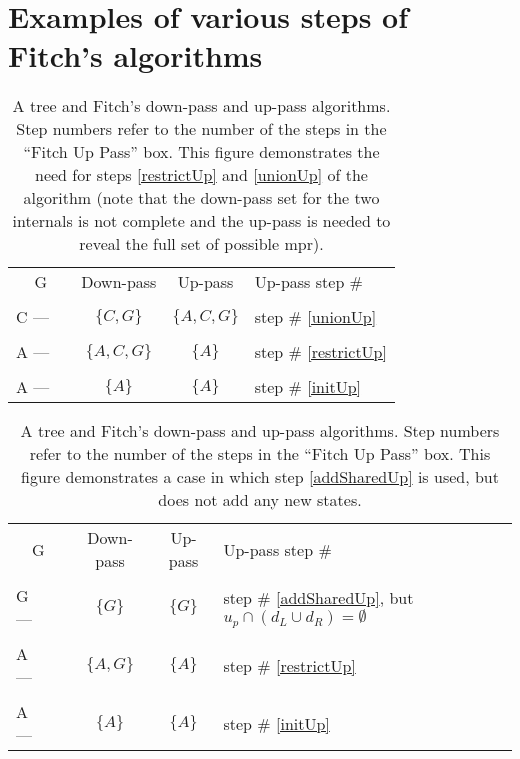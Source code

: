 \documentclass[11pt]{article}
\begin{document}
\section*{Examples of various steps of Fitch's algorithms}


\begin{table}[htdp]
\caption{A tree and Fitch's down-pass and up-pass algorithms.  
Step numbers refer to the number of the steps in the ``Fitch Up Pass'' box.  This figure demonstrates the need for steps \ref{restrictUp} and \ref{unionUp} of the algorithm (note that the down-pass set for the two internals is not complete and the up-pass is needed to reveal the full set of possible mpr). }
\begin{center}
\begin{tabular}{p{8mm}|p{7mm}c|c|l}
\multicolumn{2}{c}{G} & Down-pass & Up-pass & Up-pass step \# \\
& & & \\
C --- & &$\{C,G	\}$ & $\{A,C,G\}$ & step \# \ref{unionUp} \\
 & & & \\
A --- & & $\{A,C,G\}$ &$\{A\}$ & step \# \ref{restrictUp} \\
& & & \\
A --- & &$\{A\}$ & $\{A\}$&  step \# \ref{initUp} \\
\end{tabular}
\end{center}
\label{default}
\end{table}%

\begin{table}[htdp]
\caption{A tree and Fitch's down-pass and up-pass algorithms.  
Step numbers refer to the number of the steps in the ``Fitch Up Pass'' box.  This figure demonstrates a case in which step \ref{addSharedUp}  is used, but does not add any new states. }
\begin{center}
\begin{tabular}{p{8mm}|p{7mm}c|c|l}
\multicolumn{2}{c}{G} & Down-pass & Up-pass & Up-pass step \# \\
& & & \\
G --- & &$\{G\}$ & $\{G\}$ & step \# \ref{addSharedUp}, but $u_p \cap (d_L \cup d_R) = \emptyset$ \\
 & & & \\
A --- & & $\{A,G\}$ &$\{A\}$ & step \# \ref{restrictUp} \\
& & & \\
A --- & &$\{A\}$ & $\{A\}$&  step \# \ref{initUp} \\
\end{tabular}
\end{center}
\label{default}
\end{table}%
\end{document}
